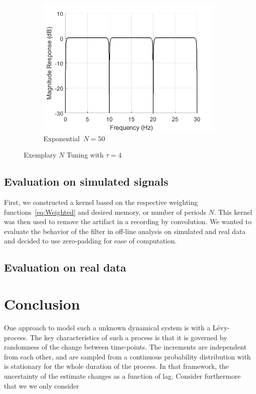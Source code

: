 \documentclass[a4paper]{article}
\begin{document}
\begin{figure}[hbtp]
\begin{subfigure}{.33\textwidth}
        \includegraphics[width=\textwidth]{img/np/mag_exp_50.png}
        \caption{Exponential~$N=50$}\label{fig:ExpNP50}
    \end{subfigure}
    \caption{Exemplary $N$ Tuning with $\tau = 4$}\label{fig:ExemplaryNPTuning}
\end{figure}



\subsection{Evaluation on simulated signals}\label{sec:EvaluationSimulated}



First, we constructed a kernel based on the respective weighting functions~\eqref{eq:Weighted} and desired memory, or number of periods $N$. This kernel was then used to remove the artifact in a recording by convolution.
We wanted to evaluate the behavior of the filter in off-line analysis on simulated and real data and decided to use zero-padding for ease of computation.

\subsection{Evaluation on real data}\label{sec:EvaluationData}

\section{Conclusion}

One approach to model such a unknown dynamical system is with a Lévy-process. The key characteristics of such a process is that it is governed by randomness of the change between time-points. The increments are independent from each other, and are sampled from a continuous probability distribution with is stationary for the whole duration of the process. In that framework, the uncertainty of the estimate changes as a function of lag. Consider furthermore that we we only consider
\end{document}
